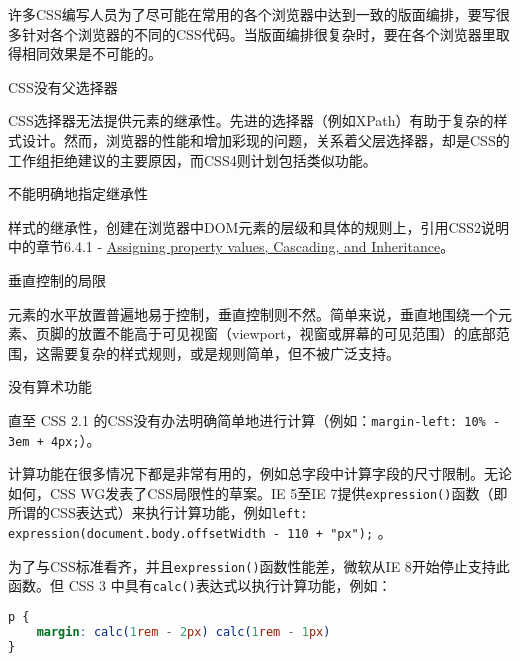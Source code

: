 许多CSS编写人员为了尽可能在常用的各个浏览器中达到一致的版面编排，要写很多针对各个浏览器的不同的CSS代码。当版面编排很复杂时，要在各个浏览器里取得相同效果是不可能的。

\begin{compactitem}
\item CSS没有父选择器
\end{compactitem}

CSS选择器无法提供元素的继承性。先进的选择器（例如XPath）有助于复杂的样式设计。然而，浏览器的性能和增加彩现的问题，关系着父层选择器，却是CSS的工作组拒绝建议的主要原因，而CSS4则计划包括类似功能。

\begin{compactitem}
\item 不能明确地指定继承性
\end{compactitem}

样式的继承性，创建在浏览器中DOM元素的层级和具体的规则上，引用CSS2说明中的章节6.4.1 - \href{http://www.w3.org/TR/CSS2/cascade.html\#cascading-order}{Assigning property values, Cascading, and Inheritance}。

\begin{compactitem}
\item 垂直控制的局限
\end{compactitem}

元素的水平放置普遍地易于控制，垂直控制则不然。简单来说，垂直地围绕一个元素、页脚的放置不能高于可见视窗（viewport，视窗或屏幕的可见范围）的底部范围，这需要复杂的样式规则，或是规则简单，但不被广泛支持。

\begin{compactitem}
\item 没有算术功能
\end{compactitem}

直至 CSS 2.1 的CSS没有办法明确简单地进行计算（例如：\texttt{margin-left: 10\% - 3em + 4px;}）。

计算功能在很多情况下都是非常有用的，例如总字段中计算字段的尺寸限制。无论如何，CSS WG发表了CSS局限性的草案。IE 5至IE 7提供\texttt{expression()}函数（即所谓的CSS表达式）来执行计算功能，例如\texttt{left: expression(document.body.offsetWidth - 110 + "px");} 。

为了与CSS标准看齐，并且\texttt{expression()}函数性能差，微软从IE 8开始停止支持此函数。但 CSS 3 中具有\texttt{calc()}表达式以执行计算功能，例如：

\begin{lstlisting}[language=CSS]
p {
    margin: calc(1rem - 2px) calc(1rem - 1px) 
}
\end{lstlisting}


